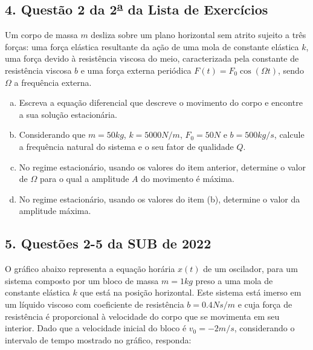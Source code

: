 \documentclass[a4paper,10pt]{article}
\begin{document}
\n

\subsection*{4. Questão 2 da 2\textsuperscript{\underline{a}} da Lista de Exercícios}

Um corpo de massa $m$ desliza sobre um plano horizontal sem atrito sujeito a três
forças: uma força elástica resultante da ação de uma mola de constante elástica
$k$, uma força devido à resistência viscosa do meio, caracterizada pela constante de
resistência viscosa $b$ e uma força externa periódica $F(t) = F_0 \cos(\Omega t)$, sendo $\Omega$ a
frequência externa.

\begin{enumerate}[(a)]
\item Escreva a equação diferencial que descreve o movimento do corpo e encontre a
sua solução estacionária.

\item Considerando que $m = 50 \unit{kg}$, $k = 5000 \unit{N/m}$, $F_0 = 50 \unit{N}$ e $b = 500 \unit{kg/s}$, calcule
a frequência natural do sistema e o seu fator de qualidade $Q$.

\item No regime estacionário, usando os valores do item anterior, determine o valor
de $\Omega$ para o qual a amplitude $A$ do movimento é máxima.

\item No regime estacionário, usando os valores do item (b), determine o valor da
amplitude máxima.
\end{enumerate}

\n

\subsection*{5. Questões 2-5 da SUB de 2022}

O gráfico abaixo representa a equação horária $x(t)$ de um oscilador,
para um sistema composto por um bloco de massa $m = 1 \unit{kg}$ preso a uma mola de constante elástica
$k$ que está na posição horizontal. Este sistema está imerso em um líquido viscoso com coeficiente
de resistência $b = 0.4 \unit{Ns/m}$ e cuja força de resistência é proporcional à velocidade do corpo que se
movimenta em seu interior. Dado que a velocidade inicial do bloco é $v_0 = −2 \unit{m/s}$, considerando o
intervalo de tempo mostrado no gráfico, responda:
\end{document}
